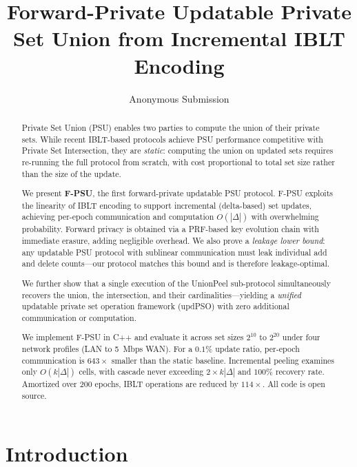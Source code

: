 \documentclass[letterpaper,twocolumn,10pt]{article}
\theoremstyle{definition}
\begin{document}
\title{Forward-Private Updatable Private Set Union from Incremental IBLT Encoding}
\author{Anonymous Submission}
\maketitle

\begin{abstract}
Private Set Union (PSU) enables two parties to compute the union of their
private sets. While recent IBLT-based protocols achieve PSU performance
competitive with Private Set Intersection, they are \emph{static}: computing the
union on updated sets requires re-running the full protocol from scratch, with
cost proportional to total set size rather than the size of the update.

We present \textbf{F-PSU}, the first forward-private updatable PSU protocol.
F-PSU exploits the linearity of IBLT encoding to support incremental
(delta-based) set updates, achieving per-epoch communication and computation
$O(|\Delta|)$ with overwhelming probability. Forward privacy is obtained via a
PRF-based key evolution chain with immediate erasure, adding negligible overhead.
We also prove a \emph{leakage lower bound}: any updatable PSU protocol with
sublinear communication must leak individual add and delete counts---our
protocol matches this bound and is therefore leakage-optimal.

We further show that a single execution of the UnionPeel sub-protocol
simultaneously recovers the union, the intersection, and their
cardinalities---yielding a \emph{unified} updatable private set operation
framework (updPSO) with zero additional communication or computation.

We implement F-PSU in C++ and evaluate it across set sizes $2^{10}$ to $2^{20}$
under four network profiles (LAN to 5~Mbps WAN). For a $0.1\%$ update ratio,
per-epoch communication is $643\times$ smaller than the static baseline.
Incremental peeling examines only $O(k|\Delta|)$ cells, with cascade never
exceeding $2\times k|\Delta|$ and $100\%$ recovery rate. Amortized over 200
epochs, IBLT operations are reduced by $114\times$. All code is open source.
\end{abstract}

\section{Introduction}
\end{document}
